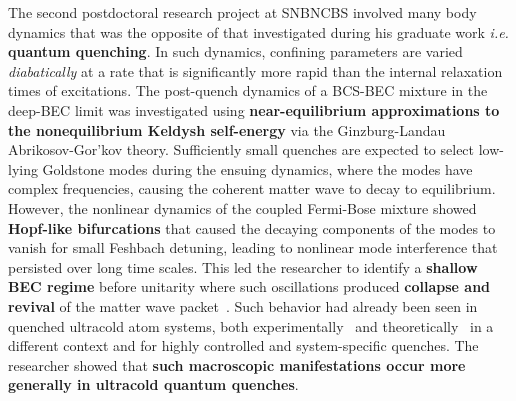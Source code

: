 \documentclass[a4paper,11pt,color]{article}
\begin{document}
The second postdoctoral research project at SNBNCBS involved many body dynamics that was the opposite of that investigated during his graduate work \textit{i.e.} \textbf{quantum quenching}. In such dynamics, confining parameters are varied \textit{diabatically} at a rate that is significantly more rapid than the internal relaxation times of excitations. The post-quench dynamics of a BCS-BEC mixture in the deep-BEC limit was investigated using \textbf{near-equilibrium approximations to the nonequilibrium Keldysh self-energy} via the Ginzburg-Landau Abrikosov-Gor'kov theory. Sufficiently small quenches are expected to select low-lying Goldstone modes during the ensuing dynamics, where the modes have complex frequencies, causing the coherent matter wave to decay to equilibrium. However, the nonlinear dynamics of the coupled Fermi-Bose mixture showed \textbf{Hopf-like bifurcations} that caused the decaying components of the modes to vanish for small Feshbach detuning, leading to nonlinear mode interference that 
persisted over long time scales. This led the researcher to identify a \textbf{shallow BEC regime} before unitarity where such oscillations produced \textbf{collapse and revival} of the matter wave packet~\cite{colrev}. Such behavior had already been seen in quenched ultracold atom systems, both experimentally~\cite{colrev:expt} and theoretically~\cite{colrev:dicke} in a different context and for highly controlled and system-specific quenches. The researcher showed that \textbf{such macroscopic manifestations occur more generally in ultracold quantum quenches}.
\end{document}
